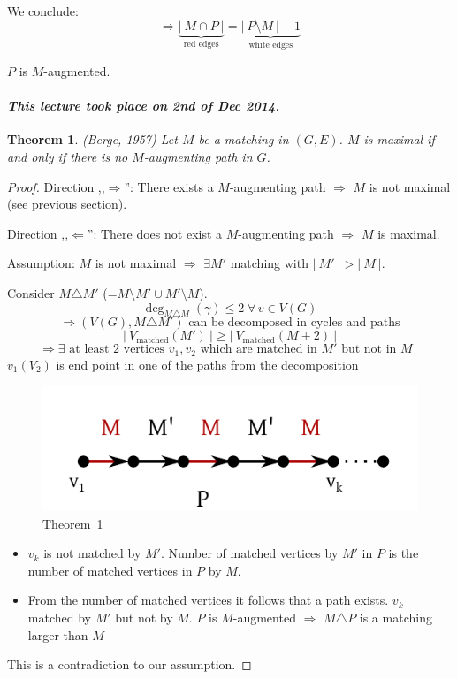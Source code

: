 \documentclass{article}
\newtheorem{theorem}{Theorem}
\newcommand{\card}[1]{\left|\:\!#1\:\!\right|}
\newcommand{\dateref}[1]{\paragraph{\textit{This lecture took place on #1.}}}
\newcommand{\fall}{\;\forall\,}
\begin{document}
We conclude:
\[ \Rightarrow \underbrace{\card{M \cap P}}_{\text{red edges}} = \underbrace{\card{P \setminus M} - 1}_{\text{white edges}} \]

$P$ is $M$-augmented.

\dateref{2nd of Dec 2014}

\begin{theorem}\label{satz-6.1}
  (Berge, 1957)
  Let $M$ be a matching in $(G, E)$. $M$ is maximal if and only if there is no $M$-augmenting path in $G$.
\end{theorem}

\begin{proof}
  Direction ,,$\Rightarrow$'': There exists a $M$-augmenting path $\Rightarrow$ $M$ is not maximal (see previous section).

  Direction ,,$\Leftarrow$'': There does not exist a $M$-augmenting path $\Rightarrow$ $M$ is maximal.

  Assumption: $M$ is not maximal $\Rightarrow$ $\exists M'$ matching with $\card{M'} > \card{M}$.

  Consider $M \triangle M'$ (=$M \setminus M' \cup M' \setminus M$).
  \[ \deg_{M \triangle M}(\gamma) \leq 2 \fall v \in V(G) \]
  \[ \Rightarrow (V(G), M \triangle M') \text{ can be decomposed in cycles and paths} \]
  \[ \card{V_{\text{matched}}(M')} \geq \card{V_{\text{matched}}(M+2)} \]
  \[ \Rightarrow \exists \text{ at least 2 vertices } v_1, v_2 \text{ which are matched in $M'$ but not in $M$ } \]
  $v_1(V_2)$ is end point in one of the paths from the decomposition

  \begin{figure}[ht]
   \begin{center}
    \includegraphics{img/satz_6_1.pdf}
    \caption{Theorem~\ref{satz-6.1}}
   \end{center}
  \end{figure}

  \begin{itemize}
    \item $v_k$ is not matched by $M'$. Number of matched vertices by $M'$ in $P$ is the number of matched vertices in $P$ by $M$.
    \item From the number of matched vertices it follows that a path exists. $v_k$ matched by $M'$ but not by $M$. $P$ is $M$-augmented $\Rightarrow$ $M \triangle P$ is a matching larger than $M$
  \end{itemize}
  This is a contradiction to our assumption.
\end{proof}
\end{document}
